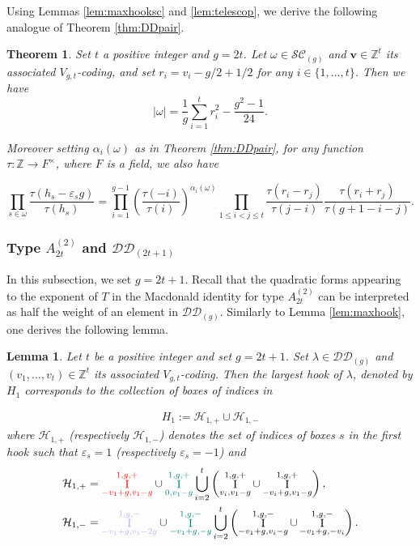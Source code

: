 \documentclass[11pt,letterpaper]{amsart}
\def\bbbz{\mathbb Z}
\def\cch{\mathcal H}
\def\ccsc{\mathcal {SC}}
\def\ccdd{\mathcal {DD}}
\newtheorem{thm}[df]{Theorem}
\newtheorem{lm}[df]{Lemma}
\DeclareMathOperator{\I}{I}
\numberwithin{equation}{section}
\numberwithin{df}{section}
\begin{document}
Using Lemmas \ref{lem:maxhooksc} and \ref{lem:telescop}, we derive the following analogue of Theorem \ref{thm:DDpair}.
\begin{thm}\label{thm:SC}
Set $t$ a positive integer and $g=2t$. Let $\omega\in \ccsc_{(g)}$ and $\mathbf{v}\in\bbbz^{t}$ its associated $V_{g,t}$-coding, and set $r_i=v_i-g/2+1/2$ for any $i\in\lbrace 1,\dots,t\rbrace$. Then we have
$$\lvert \omega\rvert = \frac{1}{g}\sum_{i=1}^{t} r_i^2-\frac{g^2-1}{24}.$$

Moreover setting $\alpha_i(\omega)$ as in Theorem \ref{thm:DDpair}, for any function $\tau:\bbbz\rightarrow F^{\times}$, where $F$ is a field, we also have

\begin{equation}\label{eq:thmsc}
\prod_{s\in\omega}\frac{\tau(h_s-\varepsilon_s g)}{\tau(h_s)}=\prod_{i=1}^{g-1}\left(\frac{\tau(-i)}{\tau(i)}\right)^{\alpha_i(\omega)}
\prod_{1\leq i<j\leq t} \frac{\tau(r_i-r_j)}{\tau(j-i)} \frac{\tau(r_i+r_j)}{\tau(g+1-i-j)}.
\end{equation}
\end{thm}


\subsubsection{Type $A^{(2)}_{2t}$ and $\ccdd_{(2t+1)}$}

In this subsection, we set $g=2t+1$. Recall that the quadratic forms appearing to the exponent of $T$ in the Macdonald identity for type $A^{(2)}_{2t}$ can be interpreted as half the weight of an element in $\ccdd_{(g)}$.
Similarly to Lemma \ref{lem:maxhook}, one derives the following lemma.
\begin{lm}\label{lem:maxhookimpair}
Let $t$ be a positive integer and set $g=2t+1$. Set $\lambda\in \ccdd_{(g)}$ and $(v_1,\dots,v_{t})\in\bbbz^t$ its associated $V_{g,t}$-coding. Then the largest hook of $\lambda$, denoted by $H_1$ corresponds to the collection of boxes of indices in

\begin{align*}
H_1:=\cch_{1,+}\cup\cch_{1,-}
\end{align*}
where $\cch_{1,+}$ (respectively $\cch_{1,-}$) denotes the set of indices of boxes $s$ in the first hook such that $\varepsilon_s=1$ (respectively $\varepsilon_s=-1$) and
\begin{align*}
\cch_{1,+}&=\textcolor{red}{\I_{-v_1+g,v_1-g}^{1,g,+}}  \cup \textcolor{teal}{\I_{0,v_1-g}^{1,g,+}}
 \displaystyle\bigcup_{i=2}^{t}\left(\I_{v_i,v_1-g}^{1,g,+}\cup \I_{-v_i+g,v_1-g}^{1,g,+}\right),\\
\cch_{1,-}&= \textcolor{blue!30}{\I_{-v_1+g,v_1-2g}^{1,g,-}} \cup\textcolor{teal}{\I_{-v_1+g,-g}^{1,g,-}} \displaystyle\bigcup_{i=2}^{t}\left(\I_{-v_1+g,v_i-g}^{1,g,-}\cup \I_{-v_1+g,-v_i}^{1,g,-}\right).
\end{align*}

\end{lm}
\end{document}
